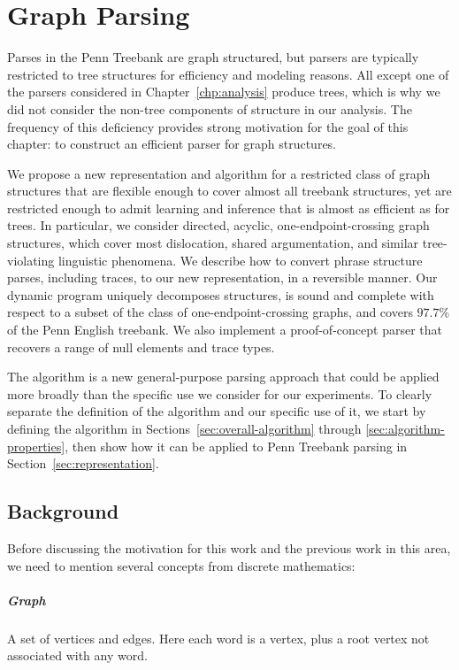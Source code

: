 \chapter{Graph Parsing} \label{chp:parsing}

Parses in the Penn Treebank \parencite{ptb} are graph structured, but parsers are typically restricted to tree structures for efficiency and modeling reasons.
All except one of the parsers considered in Chapter~\ref{chp:analysis} produce trees, which is why we did not consider the non-tree components of structure in our analysis.
The frequency of this deficiency provides strong motivation for the goal of this chapter: to construct an efficient parser for graph structures.

We propose a new representation and algorithm for a restricted class of graph structures that are flexible enough to cover almost all treebank structures, yet are restricted enough to admit learning and inference that is almost as efficient as for trees.
In particular, we consider directed, acyclic, one-endpoint-crossing graph structures, which cover most dislocation, shared argumentation, and similar tree-violating linguistic phenomena.
We describe how to convert phrase structure parses, including traces, to our new representation, in a reversible manner.
Our dynamic program uniquely decomposes structures, is sound and complete with respect to a subset of the class of one-endpoint-crossing graphs, and covers $97.7\%$ of the Penn English treebank.
We also implement a proof-of-concept parser that recovers a range of null elements and trace types.

The algorithm is a new general-purpose parsing approach that could be applied more broadly than the specific use we consider for our experiments.
To clearly separate the definition of the algorithm and our specific use of it, we start by defining the algorithm in Sections~\ref{sec:overall-algorithm} through \ref{sec:algorithm-properties}, then show how it can be applied to Penn Treebank parsing in Section~\ref{sec:representation}.

\section{Background}

Before discussing the motivation for this work and the previous work in this area, we need to mention several concepts from discrete mathematics:

\paragraph{Graph}
A set of vertices and edges.
Here each word is a vertex, plus a root vertex not associated with any word.

